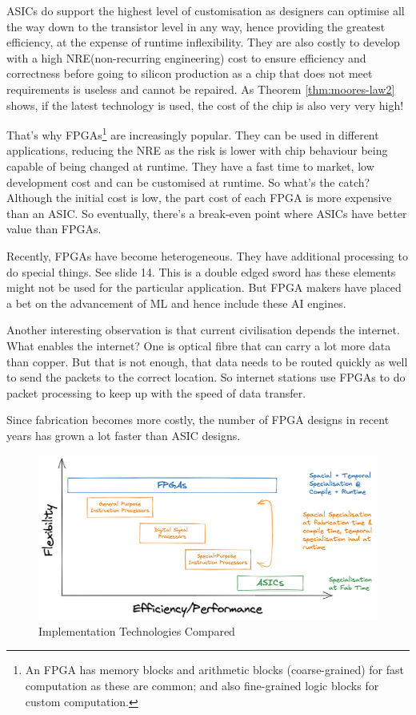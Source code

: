 \documentclass[a4paper]{scrartcl}
\begin{document}
ASICs do support the highest level of customisation as designers can optimise all
the way down to the transistor level in any way, hence providing the greatest efficiency,
at the expense of runtime inflexibility. They are also costly to develop with a high
NRE(non-recurring engineering) cost to ensure efficiency and correctness before going
to silicon production as a chip that does not meet requirements is useless and cannot
be repaired. As Theorem \ref{thm:moores-law2} shows, if the latest technology is used,
the cost of the chip is also very very high!

That's why FPGAs\footnote{An FPGA has memory blocks and arithmetic blocks (coarse-grained) for
fast computation as these are common; and also fine-grained logic blocks for custom computation. } are increasingly popular. They can be used in different applications,
reducing the NRE as the risk is lower with chip behaviour being capable of being changed
at runtime. They have a fast time to market, low development cost and can be customised
at runtime. So what's the catch? Although the initial cost is low, the part cost 
of each FPGA is more expensive than an ASIC. So eventually, there's a break-even point 
where ASICs have better value than FPGAs.  

Recently, FPGAs have become heterogeneous. They have additional processing to do 
special things. See slide 14. This is a double edged sword has these elements 
might not be used for the particular application. But FPGA makers have placed a 
bet on the advancement of ML and hence include these AI engines. 

Another interesting observation is that current civilisation depends the internet.
What enables the internet? One is optical fibre that can carry a lot more data than copper. 
But that is not enough, that data needs to be routed quickly as well to send the packets to 
the correct location. So internet stations use FPGAs to do packet processing to keep up 
with the speed of data transfer. 

Since fabrication becomes more costly, the number of FPGA designs in recent years
has grown a lot faster than ASIC designs.

\begin{figure}
    \includegraphics[width=\textwidth]{figures/L1-TechnologyComparison.png}
    \caption{Implementation Technologies Compared}
    \label{fig:fpga-vs-asic}
\end{figure}
\end{document}
